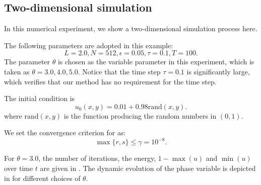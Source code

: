 \subsection{Two-dimensional simulation}
\label{subsec:2d}
In this numerical experiment, we show a two-dimensional simulation process here.
\par The following parameters are adopted in this example:
\begin{equation}
L=2.0, N=512,\epsilon=0.05, \tau=0.1, T=100.
\end{equation}
The parameter $\theta$ is chosen as the variable parameter in this experiment, which is taken as $\theta=3.0,4.0,5.0$. 
Notice that the time step $\tau=0.1$ is significantly large, 
which verifies that our method has no requirement for the time step.
\par The initial condition is
\begin{equation}
    u_0(x,y)=0.01+0.98\text{rand}(x,y).
\end{equation}
where $\text{rand}(x, y)$ is the function producing the random numbers in $(0,1)$. 
\par We set the convergence criterion for  as:
\begin{equation}
\max\{r,s\}\leq \gamma=10^{-8}.
\end{equation}

For $\theta=3.0$, the number of iterations, the energy, $1-\max (u)$ and $\min (u)$ over time $t$ are given in .
The dynamic evolution of the phase variable is depicted in  for different choices of $\theta$.


